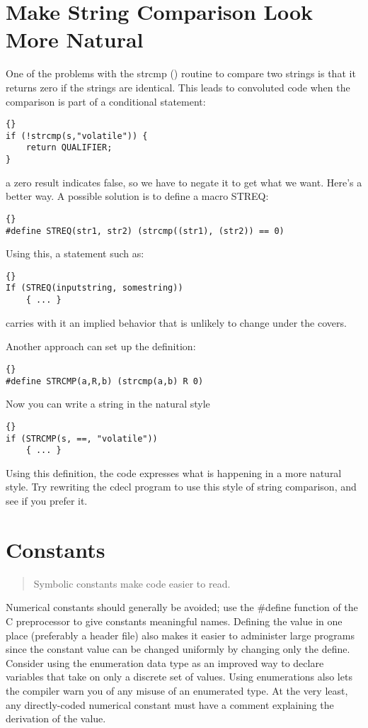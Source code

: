 \documentclass{report}
\begin{document}
\section{Make String Comparison Look More Natural}
One of the problems with the strcmp () routine to compare two strings is that it returns zero if the strings are identical. This leads to convoluted code when the comparison is part of a conditional statement: 
\begin{lstlisting}{}
if (!strcmp(s,"volatile")) {
    return QUALIFIER;
}
\end{lstlisting}
a zero result indicates false, so we have to negate it to get what we want. Here's a better way. 
A possible solution is to define a macro STREQ: 
\begin{lstlisting}{}
#define STREQ(str1, str2) (strcmp((str1), (str2)) == 0)
\end{lstlisting}
Using this, a statement such as: 
\begin{lstlisting}{}
If (STREQ(inputstring, somestring))
    { ... }
\end{lstlisting}
carries with it an implied behavior that is unlikely to change under the covers.

Another approach can set up the definition: 
\begin{lstlisting}{}
#define STRCMP(a,R,b) (strcmp(a,b) R 0) 
\end{lstlisting}
Now you can write a string in the natural style 
\begin{lstlisting}{}
if (STRCMP(s, ==, "volatile"))
    { ... }
\end{lstlisting}
Using this definition, the code expresses what is happening in a more natural style. Try rewriting the cdecl program to use this style of string comparison, and see if you prefer it.

\section{Constants}
\begin{quote}
Symbolic constants make code easier to read.
\end{quote}
Numerical constants should generally be avoided; use the \#define function of the C preprocessor to give constants meaningful names. Defining the value in one place (preferably a header file) also makes it easier to administer large programs since the constant value can be changed uniformly by changing only the define. Consider using the enumeration data type as an improved way to declare variables that take on only a discrete set of values. Using enumerations also lets the compiler warn you of any misuse of an enumerated type. At the very least, any directly-coded numerical constant must have a comment explaining the derivation of the value.
\end{document}

